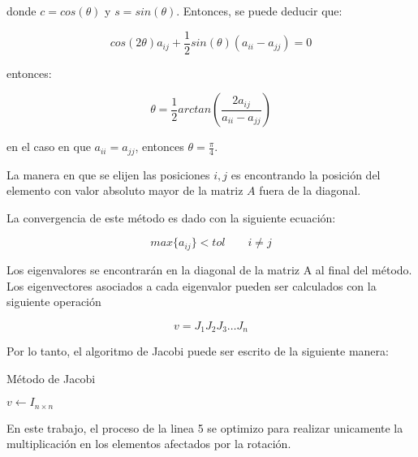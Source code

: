 donde $c=cos(\theta)$ y $s=sin(\theta)$. Entonces, se puede deducir que:

\begin{equation*}
    cos(2\theta)a_{ij}+\frac{1}{2}sin(\theta)(a_{ii}-a_{jj})=0
\end{equation*}

entonces:

\begin{equation*}
    \theta = \frac{1}{2}arctan\left(\frac{2a_{ij}}{a_{ii}-a_{jj}}\right)
\end{equation*}

en el caso en que $a_{ii}=a_{jj}$, entonces $\theta=\frac{\pi}{4}$.

La manera en que se elijen las posiciones $i,j$ es encontrando la posición del elemento con valor absoluto mayor de la matriz $A$ fuera de la diagonal.

La convergencia de este método es dado con la siguiente ecuación:

\begin{equation*}
    max\{a_{ij}\} < tol \qquad i\neq j
\end{equation*}

Los eigenvalores se encontrarán en la diagonal de la matriz A al final del método. Los eigenvectores asociados a cada eigenvalor pueden ser calculados con la siguiente operación

\begin{equation*}
    v = J_1J_2J_3\dots J_n
\end{equation*}

Por lo tanto, el algoritmo de Jacobi puede ser escrito de la siguiente manera:

\begin{algorithm}[H]
    \caption{Método de Jacobi}
    \label{alg:jacobi_method}
    $v \gets I_{n\times n}$\\
\end{algorithm}

En este trabajo, el proceso de la linea 5 se optimizo para realizar unicamente la multiplicación en los elementos afectados por la rotación.